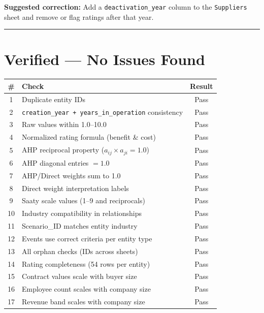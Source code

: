 \documentclass[11pt]{article}
\begin{document}
\medskip
\noindent\textbf{Suggested correction:} Add a \texttt{deactivation\_year} column to the \texttt{Suppliers} sheet and remove or flag ratings after that year.

\bigskip
\hrule
\bigskip

\section*{\checkmark\; Verified --- No Issues Found}

\begin{longtable}{clc}
\toprule
\textbf{\#} & \textbf{Check} & \textbf{Result} \\
\midrule
\endhead
1 & Duplicate entity IDs & \textcolor{okgreen}{Pass} \\
2 & \texttt{creation\_year + years\_in\_operation} consistency & \textcolor{okgreen}{Pass} \\
3 & Raw values within 1.0--10.0 & \textcolor{okgreen}{Pass} \\
4 & Normalized rating formula (benefit \& cost) & \textcolor{okgreen}{Pass} \\
5 & AHP reciprocal property ($a_{ij} \times a_{ji} = 1.0$) & \textcolor{okgreen}{Pass} \\
6 & AHP diagonal entries $= 1.0$ & \textcolor{okgreen}{Pass} \\
7 & AHP/Direct weights sum to 1.0 & \textcolor{okgreen}{Pass} \\
8 & Direct weight interpretation labels & \textcolor{okgreen}{Pass} \\
9 & Saaty scale values (1--9 and reciprocals) & \textcolor{okgreen}{Pass} \\
10 & Industry compatibility in relationships & \textcolor{okgreen}{Pass} \\
11 & Scenario\_ID matches entity industry & \textcolor{okgreen}{Pass} \\
12 & Events use correct criteria per entity type & \textcolor{okgreen}{Pass} \\
13 & All orphan checks (IDs across sheets) & \textcolor{okgreen}{Pass} \\
14 & Rating completeness (54 rows per entity) & \textcolor{okgreen}{Pass} \\
15 & Contract values scale with buyer size & \textcolor{okgreen}{Pass} \\
16 & Employee count scales with company size & \textcolor{okgreen}{Pass} \\
17 & Revenue band scales with company size & \textcolor{okgreen}{Pass} \\

\end{longtable}
\end{document}
